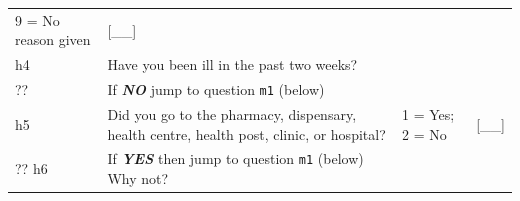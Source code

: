 \documentclass[12pt,a4paper]{book}
\theoremstyle{definition}
\theoremstyle{definition}
\theoremstyle{definition}
\theoremstyle{remark}
\begin{document}
\begin{longtable}[]{@{}llll@{}}
\begin{minipage}[t]{0.24\columnwidth}
9 = No reason given\strut
\end{minipage} & \begin{minipage}[t]{0.24\columnwidth}\raggedright
{[}\_\_{]}\strut
\end{minipage}\tabularnewline
\begin{minipage}[t]{0.09\columnwidth}\raggedright
h4\strut
\end{minipage} & \begin{minipage}[t]{0.41\columnwidth}\raggedright
Have you been ill in the past two weeks?\strut
\end{minipage} & \begin{minipage}[t]{0.25\columnwidth}\raggedright
\strut
\end{minipage} & \begin{minipage}[t]{0.13\columnwidth}\raggedright
\strut
\end{minipage}\tabularnewline
\begin{minipage}[t]{0.09\columnwidth}\raggedright
??\strut
\end{minipage} & \begin{minipage}[t]{0.41\columnwidth}\raggedright
If \textbf{\emph{NO}} jump to question \texttt{m1} (below)\strut
\end{minipage} & \begin{minipage}[t]{0.25\columnwidth}\raggedright
\strut
\end{minipage} & \begin{minipage}[t]{0.13\columnwidth}\raggedright
\strut
\end{minipage}\tabularnewline
\begin{minipage}[t]{0.09\columnwidth}\raggedright
h5\strut
\end{minipage} & \begin{minipage}[t]{0.41\columnwidth}\raggedright
Did you go to the pharmacy, dispensary, health centre, health post,
clinic, or hospital?\strut
\end{minipage} & \begin{minipage}[t]{0.25\columnwidth}\raggedright
1 = Yes; 2 = No\strut
\end{minipage} & \begin{minipage}[t]{0.13\columnwidth}\raggedright
{[}\_\_{]}\strut
\end{minipage}\tabularnewline
\begin{minipage}[t]{0.24\columnwidth}\raggedright
?? h6\strut
\end{minipage} & \begin{minipage}[t]{0.24\columnwidth}\raggedright
If \textbf{\emph{YES}} then jump to question \texttt{m1} (below) Why
not?


\end{minipage}
\end{longtable}
\end{document}
